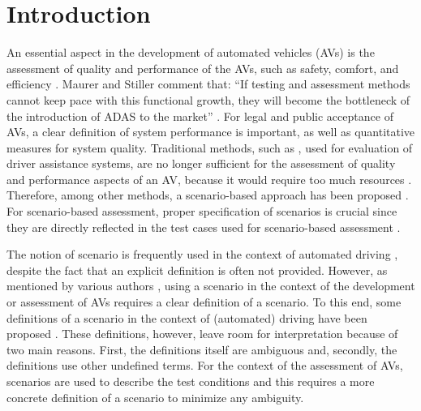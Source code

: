 \section{Introduction}
\label{sec:introduction}

An essential aspect in the development of automated vehicles (AVs) is the assessment of quality and performance of the AVs, such as safety, comfort, and efficiency \cite{bengler2014threedecades, stellet2015taxonomy, Helmer2017safety, putz2017pegasus, roesener2017comprehensive, gietelink2006development, roesener2016scenariobased, wachenfeld2016release}. 
Maurer and Stiller comment that: ``If testing and assessment methods cannot keep pace with this functional growth, they will become the bottleneck of the introduction of ADAS to the market'' \cite{bengler2014threedecades}.
For legal and public acceptance of AVs, a clear definition of system performance is important, as well as quantitative measures for system quality. 
Traditional methods, such as \cite{response2006code, ISO26262}, used for evaluation of driver assistance systems, are no longer sufficient for the assessment of quality and performance aspects of an AV, because it would require too much resources \cite{wachenfeld2016release}. 
Therefore, among other methods, a scenario-based approach has been proposed \cite{roesener2016scenariobased, putz2017pegasus}. 
For scenario-based assessment, proper specification of scenarios is crucial since they are directly reflected in the test cases used for scenario-based assessment \cite{stellet2015taxonomy}. 

The notion of scenario is frequently used in the context of automated driving \cite{putz2017pegasus, roesener2017comprehensive, gietelink2006development, hulshof2013autonomous, karaduman2013interactivebehavior, englund2016grand, xu2002effects, ebner2011identifying, ploeg2017GCDC, zofka2015datadrivetrafficscenarios}, despite the fact that an explicit definition is often not provided. However, as mentioned by various authors \cite{stellet2015taxonomy, Helmer2017safety, alvarez2017prospective, zofka2015datadrivetrafficscenarios, aparicio2013pre, lesemann2011test, putz2017pegasus, geyer2014, ulbrich2015}, using a scenario in the context of the development or assessment of AVs requires a clear definition of a scenario. To this end, some definitions of a scenario in the context of (automated) driving have been proposed \cite{geyer2014, ulbrich2015, elrofai2016scenario}.
\cbstart
These definitions, however, leave room for interpretation because of two main reasons. 
First, the definitions itself are ambiguous and, secondly, the definitions use other undefined terms.
For the context of the assessment of AVs, scenarios are used to describe the test conditions \cite{stellet2015taxonomy} and this requires a more concrete definition of a scenario to minimize any ambiguity.
\cbend

